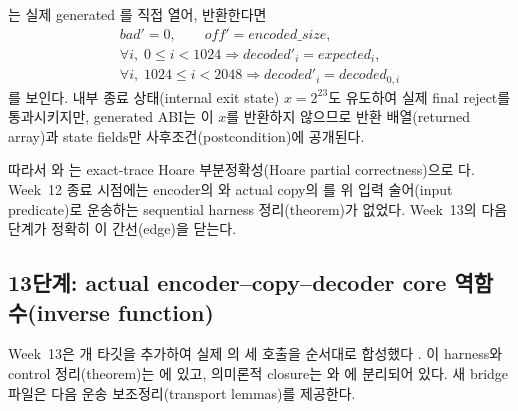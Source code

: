 \begin{verified}
는 실제 generated
를 직접 열어, 반환한다면
\[
\begin{gathered}
  bad'=0,\qquad off'=encoded\_size,\\
  \forall i,\;0\le i<1024\Longrightarrow decoded'_i=expected_i,\\
  \forall i,\;1024\le i<2048\Longrightarrow decoded'_i=decoded_{0,i}
\end{gathered}
\]
를 보인다. 내부 종료 상태(internal exit state) \(x=2^{23}\)도 유도하여 실제 final
reject를 통과시키지만, generated ABI는 이 \(x\)를 반환하지 않으므로 반환
배열(returned array)과 state fields만 사후조건(postcondition)에 공개된다.
\end{verified}

따라서 와
는 exact-trace Hoare
부분정확성(Hoare partial correctness)으로 \statusproved 다. Week~12 종료
시점에는 encoder의 와 actual copy의
를 위 입력 술어(input predicate)로 운송하는 sequential
harness 정리(theorem)가 없었다. Week~13의 다음 단계가 정확히 이 간선(edge)을
닫는다.

\subsection{13단계: actual encoder--copy--decoder core 역함수(inverse function)}

Week~13은 \WeekThirteenTargetCount 개 타깃을 추가하여 실제
의 세 호출을 순서대로 합성했다
\cite{week13-report,rans-core-composition}. 이 harness와 control 정리(theorem)는
에 있고, 의미론적 closure는
와
에 분리되어 있다. 새 bridge 파일은 다음
운송 보조정리(transport lemmas)를 제공한다.

